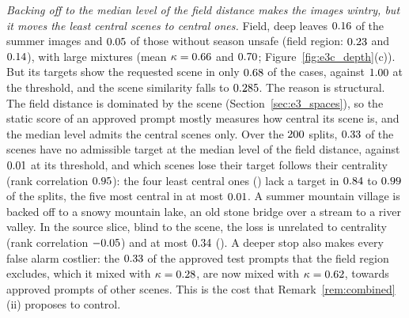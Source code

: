 \documentclass{article}
\theoremstyle{plain}
\theoremstyle{remark}
\begin{document}
\emph{Backing off to the median level of the field distance makes the images wintry, but it moves the least central scenes to
central ones.} Field, deep leaves $0.16$ of the summer images and $0.05$ of those without season unsafe (field
region: $0.23$ and $0.14$), with large mixtures (mean $\kappa=0.66$ and $0.70$;
Figure~\ref{fig:e3c_depth}(c)). But its targets show the requested scene in only $0.68$ of the cases, against $1.00$ at
the threshold, and the scene similarity falls to $0.285$. The reason is structural. The field distance is dominated by the scene
(Section~\ref{sec:e3_spaces}), so the static score of an approved prompt mostly measures how central its scene is, and the median level
admits the central scenes only. Over the $200$ splits, $0.33$ of the scenes have no admissible target at the median
level of the field distance, against $0.01$ at its threshold, and which scenes lose their target follows their centrality
(rank correlation $0.95$): the four least central ones (\ethcLeastScenes) lack a target in $0.84$ to
$0.99$ of the splits, the five most central in at most $0.01$. A summer mountain village is backed off to a
snowy mountain lake, an old stone bridge over a stream to a river valley. In the source slice, blind to the scene, the loss is
unrelated to centrality (rank correlation $-0.05$) and at most $0.34$ (\ethcLossMaxSscene). A deeper stop also
makes every false alarm costlier: the $0.33$ of the approved test prompts that the field region excludes, which it mixed
with $\kappa=0.28$, are now mixed with $\kappa=0.62$, towards approved prompts of other scenes. This is the cost that
Remark~\ref{rem:combined}(ii) proposes to control.
\end{document}
